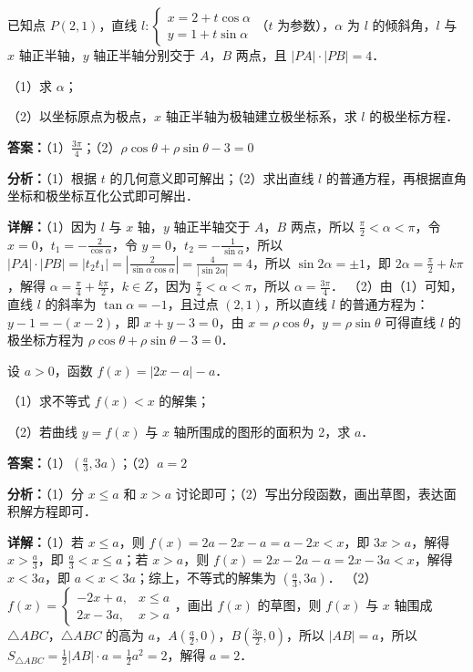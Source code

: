 \begin{question}[points=10]
已知点 $P(2,1)$，直线 $l: \begin{cases} x = 2 + t\cos\alpha \\ y = 1 + t\sin\alpha \end{cases}$（$t$ 为参数），$\alpha$ 为 $l$ 的倾斜角，$l$ 与 $x$ 轴正半轴，$y$ 轴正半轴分别交于 $A$，$B$ 两点，且 $|PA|\cdot|PB|=4$．

（1）求 $\alpha$；

（2）以坐标原点为极点，$x$ 轴正半轴为极轴建立极坐标系，求 $l$ 的极坐标方程．
\begin{solution}
\textbf{答案：}（1）$\frac{3\pi}{4}$；（2）$\rho\cos\theta + \rho\sin\theta - 3 = 0$

\textbf{分析：}（1）根据 $t$ 的几何意义即可解出；（2）求出直线 $l$ 的普通方程，再根据直角坐标和极坐标互化公式即可解出．

\textbf{详解：}（1）因为 $l$ 与 $x$ 轴，$y$ 轴正半轴交于 $A$，$B$ 两点，所以 $\frac{\pi}{2}<\alpha<\pi$，令 $x=0$，$t_1=-\frac{2}{\cos\alpha}$，令 $y=0$，$t_2=-\frac{1}{\sin\alpha}$，所以 $|PA|\cdot|PB| = |t_2 t_1| = \left|\frac{2}{\sin\alpha\cos\alpha}\right| = \frac{4}{|\sin2\alpha|} = 4$，所以 $\sin2\alpha = \pm1$，即 $2\alpha = \frac{\pi}{2}+k\pi$，解得 $\alpha = \frac{\pi}{4}+\frac{k\pi}{2}$，$k\in Z$，因为 $\frac{\pi}{2}<\alpha<\pi$，所以 $\alpha = \frac{3\pi}{4}$．
（2）由（1）可知，直线 $l$ 的斜率为 $\tan\alpha = -1$，且过点 $(2,1)$，所以直线 $l$ 的普通方程为：$y-1 = -(x-2)$，即 $x+y-3=0$，由 $x=\rho\cos\theta$，$y=\rho\sin\theta$ 可得直线 $l$ 的极坐标方程为 $\rho\cos\theta + \rho\sin\theta - 3 = 0$．
\end{solution}
\end{question}

\begin{question}[points=10]
设 $a>0$，函数 $f(x) = |2x-a| - a$．

（1）求不等式 $f(x) < x$ 的解集；

（2）若曲线 $y = f(x)$ 与 $x$ 轴所围成的图形的面积为 2，求 $a$．
\begin{solution}
\textbf{答案：}（1）$(\frac{a}{3}, 3a)$；（2）$a=2$

\textbf{分析：}（1）分 $x\le a$ 和 $x>a$ 讨论即可；（2）写出分段函数，画出草图，表达面积解方程即可．

\textbf{详解：}（1）若 $x\le a$，则 $f(x)=2a-2x-a = a-2x < x$，即 $3x > a$，解得 $x > \frac{a}{3}$，即 $\frac{a}{3} < x \le a$；若 $x>a$，则 $f(x)=2x-2a-a = 2x-3a < x$，解得 $x < 3a$，即 $a < x < 3a$；综上，不等式的解集为 $(\frac{a}{3}, 3a)$．
（2）$f(x) = \begin{cases} -2x + a, & x\le a \\ 2x - 3a, & x>a \end{cases}$，画出 $f(x)$ 的草图，则 $f(x)$ 与 $x$ 轴围成 $\triangle ABC$，$\triangle ABC$ 的高为 $a$，$A(\frac{a}{2},0)$，$B(\frac{3a}{2},0)$，所以 $|AB| = a$，所以 $S_{\triangle ABC} = \frac{1}{2}|AB|\cdot a = \frac{1}{2}a^2 = 2$，解得 $a=2$．
\end{solution}
\end{question}

